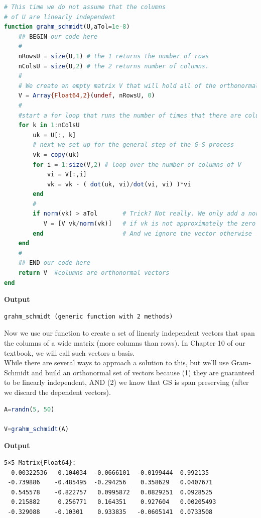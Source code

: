\begin{lstlisting}[language=Julia,style=mystyle]
# This time we do not assume that the columns 
# of U are linearly independent
function grahm_schmidt(U,aTol=1e-8)
    ## BEGIN our code here
    #
    nRowsU = size(U,1) # the 1 returns the number of rows
    nColsU = size(U,2) # the 2 returns number of columns. 
    #
    # We create an empty matrix V that will hold all of the orthonormal vectors
    V = Array{Float64,2}(undef, nRowsU, 0)
    #
    #start a for loop that runs the number of times that there are columns in U
    for k in 1:nColsU
        uk = U[:, k] 
        # next we set up for the general step of the G-S process
        vk = copy(uk)
        for i = 1:size(V,2) # loop over the number of columns of V
            vi = V[:,i]
            vk = vk - ( dot(uk, vi)/dot(vi, vi) )*vi
        end
        #
        if norm(vk) > aTol       # Trick? Not really. We only add a normalized vk 
           V = [V vk/norm(vk)]   # if vk is not approximately the zero vector. Make sense?
        end                      # And we ignore the vector otherwise
    end
    #
    ## END our code here
    return V  #columns are orthonormal vectors
end
\end{lstlisting}
\textbf{Output} 
\begin{verbatim}
grahm_schmidt (generic function with 2 methods)
\end{verbatim}

Now we use our function to create a set of linearly independent vectors that span the columns of a wide matrix (more columns than rows). In Chapter 10 of our textbook, we will call such vectors a basis.\\

While there are several ways to approach a solution to this, but we'll use Gram-Schmidt and build an orthonormal set of vectors because (1) they are guaranteed to be linearly independent, AND (2) we know that GS is span preserving (after we discard the dependent vectors).\\

\begin{lstlisting}[language=Julia,style=mystyle]
A=randn(5, 50)

V=grahm_schmidt(A)
\end{lstlisting}
\textbf{Output} 
\begin{verbatim}
5×5 Matrix{Float64}:
  0.00322536   0.104034  -0.0666101  -0.0199444  0.992135
 -0.739886    -0.485495  -0.294256    0.358629   0.0407671
  0.545578    -0.822757   0.0995872   0.0829251  0.0928525
  0.215882     0.256771   0.164351    0.927604   0.00205493
 -0.329088    -0.10301    0.933835   -0.0605141  0.0733508
\end{verbatim}


